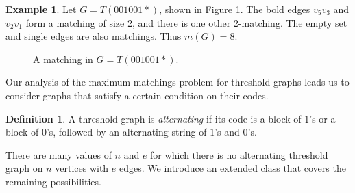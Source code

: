 \documentclass[12pt]{amsart}
\theoremstyle{plain}
\theoremstyle{definition}
\newtheorem{defi}[thm]{Definition}
\newtheorem{ex}[thm]{Example}
\begin{document}
\begin{ex}
Let $G=T(001001*)$, shown in Figure \ref{fig:ThresholdMatching}.  The bold edges $v_5v_3$ and $v_2v_1$ form a matching of size 2, and there is one other $2$-matching. 
The empty set and single edges are also matchings.  Thus $m(G)=8$. 
\begin{figure}[!ht]
\begin{center}
\caption{A matching in $G = T(001001*)$.}
\label{fig:ThresholdMatching}
\end{center}
\end{figure}


\end{ex}




Our analysis of the maximum matchings problem for threshold graphs leads us to consider graphs that satisfy a certain condition on their codes. 
\begin{defi}
A threshold graph is \emph{alternating} if its code is a block of $1$'s or a block of $0$'s, followed by an alternating string of $1$'s and $0$'s.
\end{defi}

There are many values of $n$ and $e$ for which there is no alternating threshold graph on $n$ vertices with $e$ edges.  We introduce an extended class that covers the remaining possibilities.
 
\end{document}
